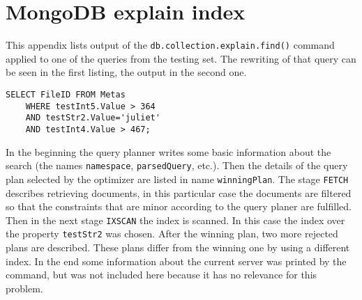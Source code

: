 \chapter{MongoDB explain index} \label{app:MDB}

This appendix lists output of the \texttt{db.collection.explain.find()} command applied to 
one of the queries from the testing set. The rewriting of that query can be seen in the first listing, the output
in the second one. 

\begin{verbatim}
SELECT FileID FROM Metas 
	WHERE testInt5.Value > 364 
	AND testStr2.Value='juliet' 
	AND testInt4.Value > 467;
\end{verbatim}

In the beginning the query planner writes some basic information about the search (the names \texttt{namespace},
\texttt{parsedQuery}, etc.). Then the details of the query plan selected by the optimizer are listed in name
\texttt{winningPlan}. The stage \texttt{FETCH} describes retrieving documents, in this particular case the documents
are filtered so that the constraints that are minor according to the query planer are fulfilled. Then in the next
stage \texttt{IXSCAN} the index is scanned. In this case the index over the property \texttt{testStr2} was chosen.
After the winning plan, two more rejected plans are described. These plans differ from the winning one by using a 
different index. In the end some information about the current server was printed by the command, but was not
included here because it has no relevance for this problem.

